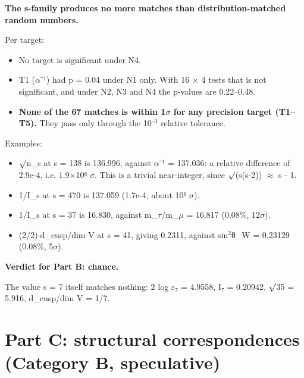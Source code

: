 \documentclass[10pt]{article}\usepackage[margin=0.8in]{geometry}\usepackage{amssymb,longtable,array,url,hyperref}\usepackage[T1]{fontenc}\usepackage{lmodern}\sloppy\usepackage{newunicodechar}\newunicodechar{η}{\ensuremath{\eta}}\newunicodechar{ω}{\ensuremath{\omega}}\newunicodechar{⁺}{\ensuremath{^{+}}}\newunicodechar{⁻}{\ensuremath{^{-}}}\newunicodechar{∏}{\ensuremath{\prod}}\newunicodechar{⁸}{\ensuremath{^{8}}}\newunicodechar{⁴}{\ensuremath{^{4}}}\newunicodechar{⁶}{\ensuremath{^{6}}}\newunicodechar{θ}{\ensuremath{\theta}}\newunicodechar{₇}{\ensuremath{_{7}}}\newunicodechar{₂}{\ensuremath{_{2}}}\newunicodechar{₁}{\ensuremath{_{1}}}\newunicodechar{⊕}{\ensuremath{\oplus}}
\begin{document}
\textbf{The s-family produces no more matches than distribution-matched random numbers.}

Per target:
\begin{itemize}
\item  No target is significant under N4.
\item  T1 ($\alpha$⁻¹) had p = 0.04 under N1 only. With 16 $\times$ 4 tests that is not significant, and under N2, N3 and N4 the p-values are 0.22--0.48.
\item  \textbf{None of the 67 matches is within 1$\sigma$ for any precision target (T1--T5).} They pass only through the 10⁻$^3$ relative tolerance.
\end{itemize}

Examples:
\begin{itemize}
\item  $\surd$n\_s at s = 138 is 136.996, against $\alpha$⁻¹ = 137.036: a relative difference of 2.9e-4, i.e. 1.9$\times$10⁶ $\sigma$. This is a trivial near-integer, since $\surd$(s(s-2)) $\approx$ s - 1.
\item  1/I\_s at s = 470 is 137.059 (1.7e-4, about 10⁶ $\sigma$).
\item  1/I\_s at s = 37 is 16.830, against m\_$\tau$/m\_$\mu$ = 16.817 (0.08\%, 12$\sigma$).
\item  (2/2)$\cdot$d\_cusp/dim V at s = 41, giving 0.2311, against sin$^2$θ\_W = 0.23129 (0.08\%, 5$\sigma$).
\end{itemize}

\textbf{Verdict for Part B: chance.}

The value s = 7 itself matches nothing: 2 log $\varepsilon$₇ = 4.9558, I₇ = 0.20942, $\surd$35 = 5.916, d\_cusp/dim V = 1/7.

\section*{Part C: structural correspondences (Category B, speculative)}
\end{document}
